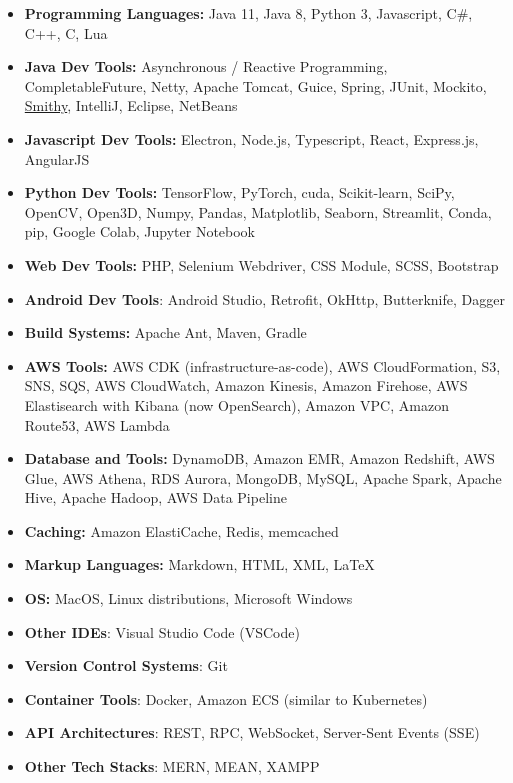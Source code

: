 \newcommand{\Smithy}{\href{https://smithy.io/}{Smithy}}
\begin{itemize}[label={}, leftmargin=0in]
   \setlength\itemsep{0em}
   \item \textbf{Programming Languages:} Java 11, Java 8, Python 3, Javascript, C\#, C++, C, Lua
   \item \textbf{Java Dev Tools:} Asynchronous / Reactive Programming, CompletableFuture, Netty, Apache Tomcat, Guice, Spring, JUnit, Mockito, \Smithy, IntelliJ, Eclipse, NetBeans
   \item \textbf{Javascript Dev Tools:} Electron, Node.js, Typescript, React, Express.js, AngularJS
   \item \textbf{Python Dev Tools:} TensorFlow, PyTorch, cuda, Scikit-learn, SciPy, OpenCV, Open3D, Numpy, Pandas, Matplotlib, Seaborn, Streamlit, Conda, pip, Google Colab, Jupyter Notebook
   \item \textbf{Web Dev Tools:} PHP, Selenium Webdriver, CSS Module, SCSS, Bootstrap
   \item \textbf{Android Dev Tools}: Android Studio, Retrofit, OkHttp, Butterknife, Dagger
   \item \textbf{Build Systems:} Apache Ant, Maven, Gradle
   \item \textbf{AWS Tools:} AWS CDK (infrastructure-as-code), AWS CloudFormation, S3, SNS, SQS, AWS CloudWatch, Amazon Kinesis, Amazon Firehose, AWS Elastisearch with Kibana (now OpenSearch), Amazon VPC, Amazon Route53, AWS Lambda
   \item \textbf{Database and Tools:} DynamoDB, Amazon EMR, Amazon Redshift, AWS Glue, AWS Athena, RDS Aurora, MongoDB, MySQL, Apache Spark, Apache Hive, Apache Hadoop, AWS Data Pipeline
   \item \textbf{Caching:} Amazon ElastiCache, Redis, memcached
   \item \textbf{Markup Languages:} Markdown, HTML, XML, \LaTeX
   \item \textbf{OS:} MacOS, Linux distributions, Microsoft Windows
   \item \textbf{Other IDEs}: Visual Studio Code (VSCode)
   \item \textbf{Version Control Systems}: Git
   \item \textbf{Container Tools}: Docker, Amazon ECS (similar to Kubernetes)
   \item \textbf{API Architectures}: REST, RPC, WebSocket, Server-Sent Events (SSE)
   \item \textbf{Other Tech Stacks}: MERN, MEAN, XAMPP
\end{itemize}
